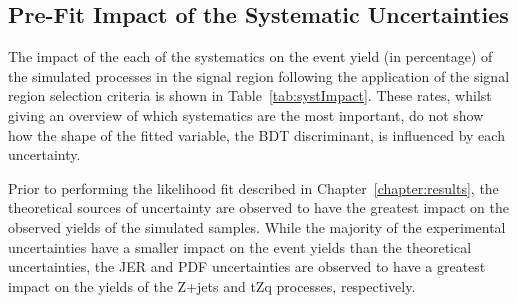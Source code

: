 \subsection{Pre-Fit Impact of the Systematic Uncertainties}\label{sec:uncertainitiesPreFitImpact}
The impact of the each of the systematics on the event yield (in percentage) of the simulated processes in the signal region following the application of the signal region selection criteria is shown in Table~\ref{tab:systImpact}.
These rates, whilst giving an overview of which systematics are the most important, do not show how the shape of the fitted variable, the BDT discriminant, is influenced by each uncertainty.

Prior to performing the likelihood fit described in Chapter~\ref{chapter:results}, the theoretical sources of uncertainty are observed to have the greatest impact on the observed yields of the simulated samples.
While the majority of the experimental uncertainties have a smaller impact on the event yields than the theoretical uncertainties, the JER and PDF uncertainties are observed to have a greatest impact on the yields of the Z+jets and tZq processes, respectively.

